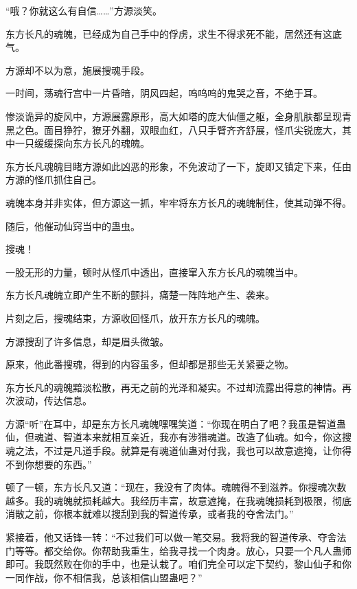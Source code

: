 
\begin{this_body}

“哦？你就这么有自信……”方源淡笑。

东方长凡的魂魄，已经成为自己手中的俘虏，求生不得求死不能，居然还有这底气。

方源却不以为意，施展搜魂手段。

一时间，荡魂行宫中一片昏暗，阴风四起，呜呜呜的鬼哭之音，不绝于耳。

惨淡诡异的旋风中，方源展露原形，高大如塔的庞大仙僵之躯，全身肌肤都呈现青黑之色。面目狰狞，獠牙外翻，双眼血红，八只手臂齐齐舒展，怪爪尖锐庞大，其中一只缓缓探向东方长凡的魂魄。

东方长凡魂魄目睹方源如此凶恶的形象，不免波动了一下，旋即又镇定下来，任由方源的怪爪抓住自己。

魂魄本身并非实体，但方源这一抓，牢牢将东方长凡的魂魄制住，使其动弹不得。

随后，他催动仙窍当中的蛊虫。

搜魂！

一股无形的力量，顿时从怪爪中透出，直接窜入东方长凡的魂魄当中。

东方长凡魂魄立即产生不断的颤抖，痛楚一阵阵地产生、袭来。

片刻之后，搜魂结束，方源收回怪爪，放开东方长凡的魂魄。

方源搜刮了许多信息，却是眉头微皱。

原来，他此番搜魂，得到的内容虽多，但却都是那些无关紧要之物。

东方长凡的魂魄黯淡松散，再无之前的光泽和凝实。不过却流露出得意的神情。再次波动，传达信息。

方源“听”在耳中，却是东方长凡魂魄嘿嘿笑道：“你现在明白了吧？我虽是智道蛊仙，但魂道、智道本来就相互亲近，我亦有涉猎魂道。改造了仙魂。如今，你这搜魂之法，不过是凡道手段。就算是有魂道仙蛊对付我，我也可以故意遮掩，让你得不到你想要的东西。”

顿了一顿，东方长凡又道：“现在，我没有了肉体。魂魄得不到滋养。你搜魂次数越多。我的魂魄就损耗越大。我经历丰富，故意遮掩，在我魂魄损耗到极限，彻底消散之前，你根本就难以搜刮到我的智道传承，或者我的夺舍法门。”

紧接着，他又话锋一转：“不过我们可以做一笔交易。我将我的智道传承、夺舍法门等等。都交给你。你帮助我重生，给我寻找一个肉身。放心，只要一个凡人蛊师即可。我既然败在你的手中，也是认栽了。咱们完全可以定下契约，黎山仙子和你一同作战，你不相信我，总该相信山盟蛊吧？”


\end{this_body}
